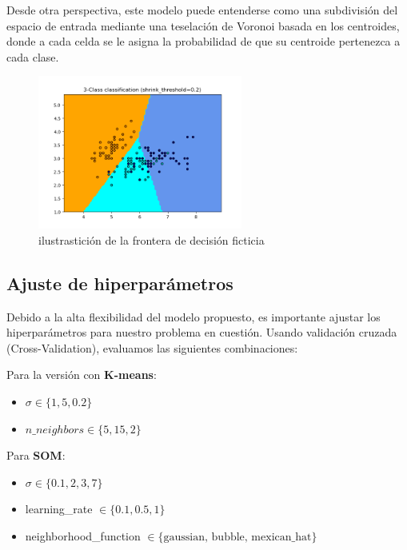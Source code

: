 \documentclass[titlepage,a4paper]{article}
\begin{document}
Desde otra perspectiva, este modelo puede entenderse como una subdivisión del espacio de entrada mediante una teselación de Voronoi basada en los centroides, donde a cada celda se le asigna la probabilidad de que su centroide pertenezca a cada clase.

\begin{figure}[H] %
    \centering
    \includegraphics[width=0.6\textwidth]{frontera de decision.png} %
    \caption{ilustrastición de la frontera de decisión ficticia}
    \label{fig:mi_figura} %
\end{figure}

\subsection{Ajuste de hiperparámetros}
Debido a la alta flexibilidad del modelo propuesto, es importante ajustar los hiperparámetros para nuestro problema en cuestión. Usando validación cruzada (Cross-Validation), evaluamos las siguientes combinaciones:

Para la versión con \textbf{K-means}:  
\begin{itemize}
    \item $\sigma \in \{1, 5, 0.2\}$
    \item $n\_neighbors \in \{5, 15, 2\}$
\end{itemize}

Para \textbf{SOM}:  
\begin{itemize}
    \item $\sigma \in \{0.1, 2, 3, 7\}$
    \item learning\_rate $\in \{0.1, 0.5, 1\}$
    \item neighborhood\_function $\in \{\text{gaussian, bubble, mexican\_hat}\}$
\end{itemize}
\end{document}
